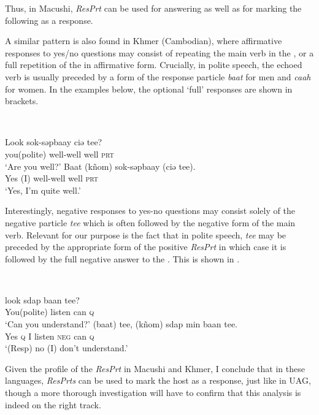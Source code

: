 \documentclass[output=paper]{LSP/langsci}
\begin{document}
Thus, in Macushi, \textit{ResPrt} can be used for answering as well as for marking the following  as a response.

A similar pattern is also found in Khmer (Cambodian), where affirmative responses to yes/no questions may consist of repeating the main verb in the , or a full repetition of the  in affirmative form. Crucially, in polite speech, the echoed verb is usually preceded by a form of the response particle \textit{baat} for men  and \textit{caah} for women. In the examples below, the optional ‘full’ responses are shown in brackets.


\ea\label{ex:wiltschko:79}
\\
\begin{xlist}
\gll Look     sok-səpbaay   ciə   tee? \\
you(polite)  well-well  well  \textsc{prt}\\
\glt ‘Are you well?’
\gll Baat (kñom)  sok-səpbaay   (ciə   tee).\\
Yes  (I)  well-well  well  \textsc{prt}  \\
\glt ‘Yes, I’m quite well.’
\end{xlist}
\z

Interestingly, negative responses to yes-no questions may consist solely of the negative particle \textit{tee} which is often followed by the negative form of the main verb.
Relevant for our purpose is the fact that in polite speech, \textit{tee} may be preceded by the appropriate form of the positive \textit{ResPrt} in which case it is followed by the full negative answer to the . This is shown in .

\ea\label{ex:wiltschko:80}
\\
\begin{xlist}
\gll look     sdap  baan  tee? \\
You(polite)  listen  can  \textsc{q}\\
\glt ‘Can you understand?’
\gll (baat) tee,   (kñom) sdap  min   baan tee.\\
  Yes    \textsc{q}     I      listen \textsc{neg}  can   \textsc{q}\\
  \glt ‘(Resp) no (I) don’t understand.’
\end{xlist}
\z

Given the profile of the \textit{ResPrt} in Macushi and Khmer, I conclude that in these languages, \textit{ResPrts} can be used to mark the host  as a response, just like in UAG, though a more thorough investigation will have to confirm that this analysis is indeed on the right track. 
\end{document}
